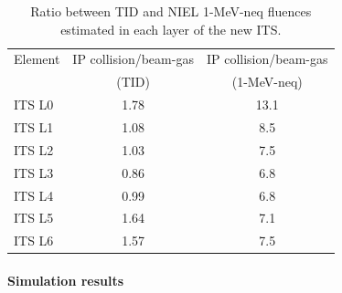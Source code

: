 \begin{table}[ht!]
\begin{minipage}{\textwidth}
\begin{center}
\begin{tabular}{l c c}
\toprule
Element	& IP collision/beam-gas  & IP collision/beam-gas 	 	\\
			& (TID)		  & (1-MeV-neq)		\\
\midrule
ITS L0	 		& 1.78	    	& 13.1 \\
ITS L1		    	& 1.08		& 8.5  \\
ITS L2			& 1.03		& 7.5  \\
ITS L3			& 0.86		& 6.8	  \\
ITS L4			& 0.99	    	& 6.8	  \\
ITS L5			& 1.64		& 7.1	  \\
ITS L6			& 1.57	  	& 7.5	  \\

\midrule	
\end{tabular}
\end{center}
\caption{Ratio between TID and NIEL 1-MeV-neq fluences estimated in each layer of the new ITS.}
\label{bkgd-coll-ratio}
\end{minipage}
\end{table}

\paragraph{Simulation results}

